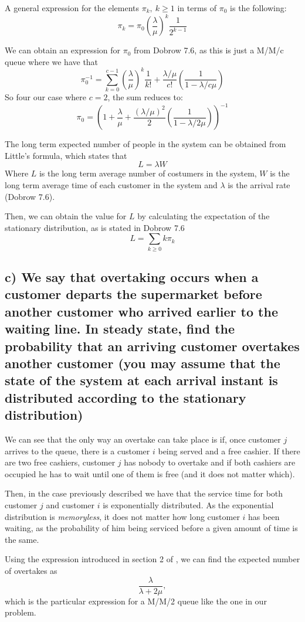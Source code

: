 \documentclass[11pt, a4paper]{article}
\begin{document}
A general expression for the elements $\pi_k, \ k\geq 1$ in terms of $\pi_0$ is the following:
\[
	\pi_k = \pi_0\left(\frac{\lambda}{\mu}\right)^k \frac{1}{2^{k-1}}
\]

We can obtain an expression for $\pi_0$ from Dobrow 7.6, as this is just a M/M/c queue where we have that
\[
	\pi_0^{-1} = \sum_{k=0}^{c-1} \left(\frac{\lambda}{\mu}\right)^k \frac{1}{k!} + \frac{\lambda / \mu}{c!} \left(\frac{1}{1 - \lambda/c\mu}\right)
\]
So four our case where $c=2$, the sum reduces to:
\[
	\pi_0 = \left(1 + \frac{\lambda}{\mu} + \frac{(\lambda/\mu)^2}{2}\left(\frac{1}{1 - \lambda/2\mu}\right)\right)^{-1}
\]

The long term expected number of people in the system can be obtained from Little's formula, which states that 
\[
	L = \lambda W
\]
Where $L$ is the long term average number of costumers in the system, $W$ is the long term average time of each customer in the system and $\lambda$ is the arrival rate (Dobrow 7.6).

Then, we can obtain the value for $L$ by calculating the expectation of the stationary distribution, as is stated in Dobrow 7.6
\[
	 L = \sum_{k \geq 0} k\pi_k
\]
\subsection*{c) We say that overtaking occurs when a customer departs the supermarket before another customer who arrived earlier to the waiting line. In steady state, find the probability that an arriving customer overtakes another customer (you may assume that the state of the system at each arrival instant is distributed according to the stationary distribution)}
We can see that the only way an overtake can take place is if, once customer $j$ arrives to the queue, there is a customer $i$ being served and a free cashier. 
If there are two free cashiers, customer $j$ has nobody to overtake and if both cashiers are occupied he has to wait until one of them is free (and it does not matter which).

Then, in the case previously described we have that the service time for both customer $j$ and customer $i$ is exponentially distributed. As the exponential distribution is \emph{memoryless}, it does not matter how long customer $i$ has been waiting, as the probability of him being serviced before a given amount of time is the same.

Using the expression introduced in section 2 of \cite{baumann2018number}, we can find the expected number of overtakes as
\[
	\frac{\lambda}{\lambda + 2\mu},
\]
which is the particular expression for a M/M/2 queue like the one in our problem.
\end{document}
